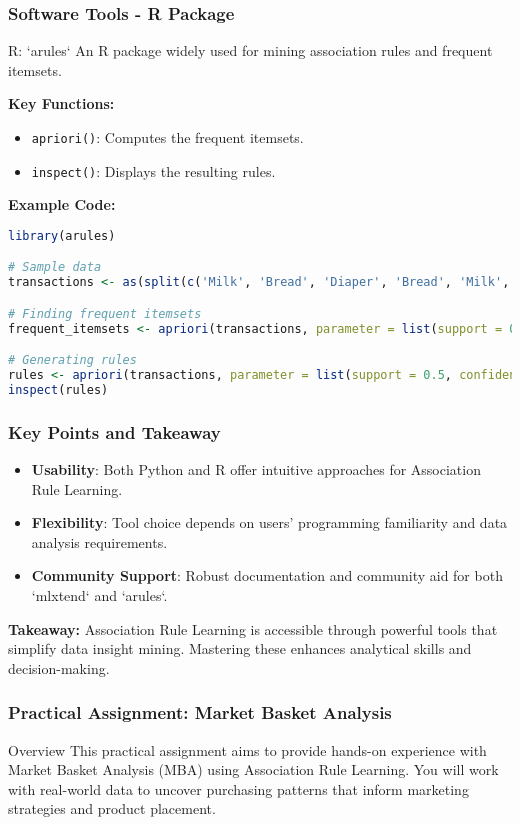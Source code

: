 \documentclass[aspectratio=169]{beamer}
\begin{document}
\begin{frame}[fragile]
    \frametitle{Software Tools - R Package}
    \begin{block}{R: `arules`}
        An R package widely used for mining association rules and frequent itemsets.
        
        \textbf{Key Functions:}
        \begin{itemize}
            \item \texttt{apriori()}: Computes the frequent itemsets.
            \item \texttt{inspect()}: Displays the resulting rules.
        \end{itemize}
        
        \textbf{Example Code:}
        \begin{lstlisting}[language=R]
library(arules)

# Sample data
transactions <- as(split(c('Milk', 'Bread', 'Diaper', 'Bread', 'Milk', 'Diaper', 'Milk'), ' '), "transactions")

# Finding frequent itemsets
frequent_itemsets <- apriori(transactions, parameter = list(support = 0.5, target = "frequent itemsets"))

# Generating rules
rules <- apriori(transactions, parameter = list(support = 0.5, confidence = 0.8))
inspect(rules)
        \end{lstlisting}
    \end{block}
\end{frame}

\begin{frame}
    \frametitle{Key Points and Takeaway}
    \begin{itemize}
        \item \textbf{Usability}: Both Python and R offer intuitive approaches for Association Rule Learning.
        \item \textbf{Flexibility}: Tool choice depends on users' programming familiarity and data analysis requirements.
        \item \textbf{Community Support}: Robust documentation and community aid for both `mlxtend` and `arules`.
    \end{itemize}
    
    \textbf{Takeaway:} Association Rule Learning is accessible through powerful tools that simplify data insight mining. Mastering these enhances analytical skills and decision-making.
\end{frame}

\begin{frame}[fragile]
    \frametitle{Practical Assignment: Market Basket Analysis}
    \begin{block}{Overview}
        This practical assignment aims to provide hands-on experience with Market Basket Analysis (MBA) using Association Rule Learning. You will work with real-world data to uncover purchasing patterns that inform marketing strategies and product placement.
    \end{block}
\end{frame}
\end{document}
